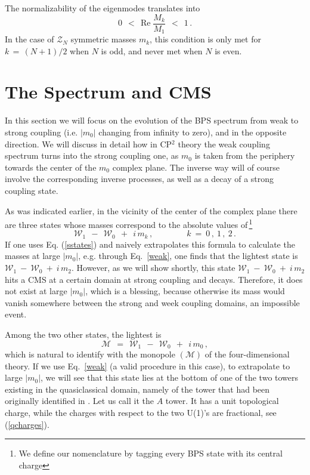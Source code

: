 \documentclass[epsfig,12pt]{article}
\def\beq{\begin{equation}}
\def\eeq{\end{equation}}
\def\beq{\begin{equation}}
\def\eeq{\end{equation}}
\newcommand{\mc}[1]{\mathcal{#1}}
\newcommand{\W}{\mathcal{W}}
\newcommand{\M}{\mathcal{M}}
\begin{document}
	The normalizability of the eigenmodes translates into
\beq
\label{norm}
	0 ~~<~~ \text{Re}\; \frac{ M_k }
                                 { M_1 } ~~<~~ 1\,.
\eeq
	In the case of $ \mc{Z}_N $ symmetric masses $ m_k $, this condition is only met for $ k \,=\, (N+1)/2 $
	when $ N $ is odd, and never met when $ N $ is even.


\newpage
\section{The Spectrum and CMS}
\label{secspectrum}
\setcounter{equation}{0}

	In this section we will focus on the
	evolution of the BPS spectrum from weak to strong coupling (i.e. $|m_0|$ changing from infinity to zero),
	and in the opposite direction.
	We will discuss in detail how in CP$^2$ theory the weak coupling  
	spectrum turns into the strong coupling	one, as $ m_0 $ is taken 
	from the periphery towards the center of the $ m_0 $ complex plane.
	The inverse way will of course involve the corresponding inverse processes, as well as a decay of a 
	strong coupling state.

	As was indicated earlier, in the vicinity of the center of the complex plane there are three states
	whose masses correspond to the absolute values of\,\footnote{We define our nomenclature by tagging every BPS state with its central charge}
\beq
\label{sstates}
	\W_1 ~~-~~ \W_0   ~~+~~ i\, m_k\,,   \qquad\qquad k ~=~ 0\,,~1\,,~2\,.
\eeq
	If one uses Eq. (\ref{sstates}) and  naively extrapolates this formula to calculate  the  masses at large $ |m_0| $, e.g. through Eq.~\eqref{weak},
	one  finds that the lightest state is $ \W_1 ~-~ \W_0 ~+~ i\, m_2 $.
	However, as we will show shortly, this state $ \W_1 ~-~ \W_0 ~+~ i\, m_2 $ hits a CMS at a certain domain at strong coupling
	and decays. 
	Therefore, it does not exist at large  $ |m_0| $, which is a blessing, because otherwise
	its mass would vanish somewhere between the strong and week coupling domains, an impossible event.
	
	Among the two other  states, the lightest is
\beq
\label{monopole}
	\M ~~=~~ \W_1 ~~-~~ \W_0   ~~+~~ i\, m_0\,,
\eeq
	which is natural to identify with the monopole $ ({\mathcal M}) $ of the four-dimensional theory.
	If we use Eq.~\eqref{weak} (a valid procedure in this case), to extrapolate to
	large $ |m_0| $, we will see that this state lies at the bottom of one of the two towers existing 
	in the quasiclassical domain, namely of the tower that had been originally identified in \cite{Dorey:1998yh}.
	Let us call it the $A$ tower.  
	It has a unit topological charge, while the charges with respect to the two U(1)'s  are fractional, see (\ref{qcharges}).
	
\end{document}
